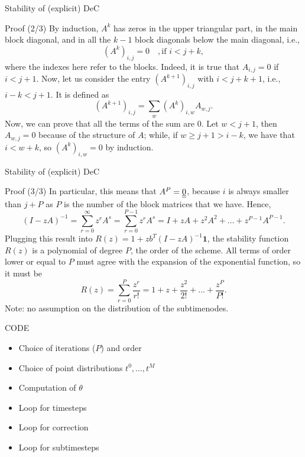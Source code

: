 \documentclass[9pt,compress,t,aspectratio=169]{beamer}
\begin{document}
\begin{frame}{Stability of (explicit) DeC}
		\begin{block}{Proof (2/3)}
	By induction, $A^k$ 
	has zeros in the upper triangular part, in the main block diagonal, and in all the $k-1$ block diagonals below the main diagonal, i.e., $$(A^k)_{i,j} = 0 \quad, \text{if } i< j+k,$$ where the indexes here refer to the blocks.
	Indeed, it is true that $A_{i,j}=0$ if $i<j+1$.
	Now, let us consider the entry $(A^{k+1})_{i,j}$ with $i<j+k+1$, i.e., $i-k<j+1$. It is defined as
	\begin{equation}
		(A^{k+1})_{i,j} = \sum_{w} (A^{k})_{i,w} A_{w,j}.
	\end{equation}
	Now, we can prove that all the terms of the sum are 0. Let $w<j+1$, then $A_{w,j}=0$ because of the structure of $A$; while, if $w\geq j+1 >i-k$, we have that $i<w+k$, so $(A^k)_{i,w} = 0$ by induction. 
\end{block}
\end{frame}


\begin{frame}{Stability of (explicit) DeC}
	\begin{block}{Proof (3/3)}
		In particular, this means that $A^{P}=\underline{\underline{0}}$, because $i$ is always smaller than $j+P$ as $P$ is the number of the block matrices that we have.
		Hence, 
		\begin{equation}
			(I-zA)^{-1}=\sum_{r=0}^{\infty} z^rA^s =\sum_{r=0}^{P-1} z^rA^s = I + zA + z^2A^2+\dots + z^{P-1}A^{P-1}. 
		\end{equation}
		Plugging this result into $R(z) = 1+ z b^T (I-zA)^{-1} \mathbf{1}$,
		the stability function $R(z)$ is a polynomial of degree $P$, the order of the scheme. 
		All terms of order lower or equal to $P$ must agree with the expansion of the exponential function, so it must be
		\begin{equation}
			R(z) = \sum_{r=0}^{P} \frac{z^r}{r!}= 1 + z + \frac{z^2}{2!} +\dots +\frac{z^P}{P!}.
		\end{equation}
		Note: no assumption on the distribution of the subtimenodes.
	\end{block}
\end{frame}

\begin{frame}{CODE}
\begin{itemize}
	\item Choice of iterations ($P$) and order
	\item Choice of point distributions $t^0, \dots, t^M$
	\item Computation of $\theta$
	\item Loop for timesteps
	\item Loop for correction
	\item Loop for subtimesteps
\end{itemize}
\end{frame}
\end{document}
